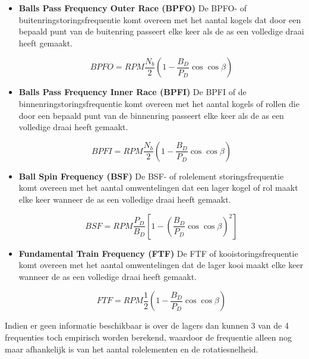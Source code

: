 \begin{itemize}
	\item \textbf{Balls Pass Frequency Outer Race (\gls{BPFO})} De \gls{BPFO}- of buitenringstoringsfrequentie komt overeen met het aantal kogels dat door een bepaald punt van de buitenring passeert elke keer als de as een volledige draai heeft gemaakt.
	
		\subitem 
			\begin{equation}
				BPFO = RPM\frac{N_b}{2}(1-\frac{B_D}{P_D}\cos\cos\beta)
			\end{equation}
	
	\item \textbf{Balls Pass Frequency Inner Race (\gls{BPFI})} De \gls{BPFI} of de binnenringstoringsfrequentie  komt overeen met het aantal kogels of rollen die door een bepaald punt van de binnenring passeert elke keer als de as een volledige draai heeft gemaakt.
	
		\subitem
			\begin{equation}
				BPFI = RPM\frac{N_b}{2}(1-\frac{B_D}{P_D}\cos \cos \beta)
			\end{equation}
			
	\item \textbf{Ball Spin Frequency (\gls{BSF})} De BSF- of rolelement storingsfrequentie komt overeen met het aantal omwentelingen dat een lager kogel of rol maakt elke keer wanneer de as een volledige draai heeft gemaakt.
	
		\subitem
			\begin{equation}
				BSF = RPM\frac{P_D}{B_D}[1-(\frac{B_D}{P_D} \cos \cos \beta)^2]
			\end{equation}
			
	\item \textbf{Fundamental Train Frequency (\gls{FTF})} De \gls{FTF} of kooistoringsfrequentie komt overeen met het aantal omwentelingen dat de lager kooi maakt elke keer wanneer de as een volledige draai heeft gemaakt.
	
		\subitem
			\begin{equation}
				FTF=RPM\frac{1}{2}(1-\frac{B_D}{P_D} \cos \cos \beta)
			\end{equation}
\end{itemize}

Indien er geen informatie beschikbaar is over de lagers dan kunnen 3 van de 4 frequenties toch empirisch worden berekend, waardoor de frequentie alleen nog maar afhankelijk is van het aantal rolelementen en de rotatiesnelheid.


